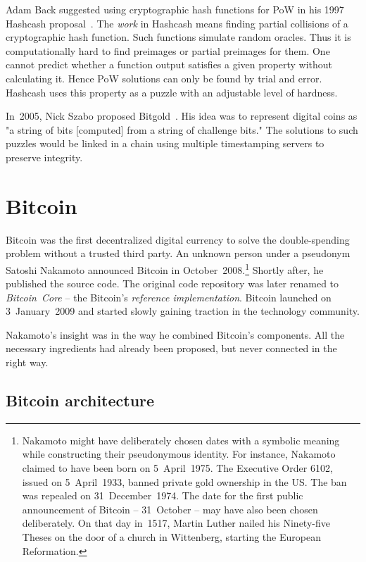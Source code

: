 Adam Back suggested using cryptographic hash functions for PoW in his 1997 Hashcash proposal~\cite{Back1997}.
The \textit{work} in Hashcash means finding partial collisions of a cryptographic hash function.
Such functions simulate random oracles.
Thus it is computationally hard to find preimages or partial preimages for them.
One cannot predict whether a function output satisfies a given property without calculating it.
Hence PoW solutions can only be found by trial and error.
Hashcash uses this property as a puzzle with an adjustable level of hardness.

In~2005, Nick Szabo proposed Bitgold~\cite{Szabo2005}.
His idea was to represent digital coins as "a string of bits [computed] from a string of challenge bits."
The solutions to such puzzles would be linked in a chain using multiple timestamping servers to preserve integrity.


\section{Bitcoin}
\label{sec:Bitcoin}

Bitcoin was the first decentralized digital currency to solve the double-spending problem without a trusted third party.
An unknown person under a pseudonym Satoshi Nakamoto announced Bitcoin in October~2008.\footnote{Nakamoto might have deliberately chosen dates with a symbolic meaning while constructing their pseudonymous identity. For instance, Nakamoto claimed to have been born on 5~April~1975. The Executive Order 6102, issued on 5~April~1933, banned private gold ownership in the US. The ban was repealed on 31~December~1974. The date for the first public announcement of Bitcoin -- 31~October -- may have also been chosen deliberately. On that day in~1517, Martin Luther nailed his Ninety-five Theses on the door of a church in Wittenberg, starting the European Reformation.}
Shortly after, he published the source code.
The original code repository was later renamed to \textit{Bitcoin~Core} -- the Bitcoin's \textit{reference implementation}.
Bitcoin launched on 3~January~2009 and started slowly gaining traction in the technology community.

Nakamoto's insight was in the way he combined Bitcoin's components.
All the necessary ingredients had already been proposed, but never connected in the right way.


\subsection{Bitcoin architecture}

